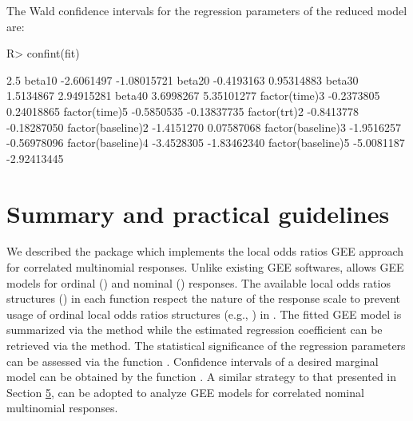 \documentclass[
]{jss}
\begin{document}
The Wald confidence intervals for the regression parameters of the
reduced model are:

\begin{CodeChunk}

\begin{CodeInput}
R> confint(fit)
\end{CodeInput}

\begin{CodeOutput}
                       2.5 %
beta10            -2.6061497 -1.08015721
beta20            -0.4193163  0.95314883
beta30             1.5134867  2.94915281
beta40             3.6998267  5.35101277
factor(time)3     -0.2373805  0.24018865
factor(time)5     -0.5850535 -0.13837735
factor(trt)2      -0.8413778 -0.18287050
factor(baseline)2 -1.4151270  0.07587068
factor(baseline)3 -1.9516257 -0.56978096
factor(baseline)4 -3.4528305 -1.83462340
factor(baseline)5 -5.0081187 -2.92413445
\end{CodeOutput}
\end{CodeChunk}

\hypertarget{Summary}{%
\section{Summary and practical guidelines}\label{Summary}}

We described the  package  which implements the
local odds ratios GEE approach \citep{Touloumis2012} for correlated
multinomial responses. Unlike existing GEE softwares, 
allows GEE models for ordinal () and nominal
() responses. The available local odds ratios structures
() in each function respect the nature of the response
scale to prevent usage of ordinal local odds ratios structures (e.g.,
) in . The fitted GEE model is
summarized via the  method while the estimated regression
coefficient can be retrieved via the  method. The statistical
significance of the regression parameters can be assessed via the
function . Confidence intervals of a desired marginal model
can be obtained by the function . A similar strategy to
that presented in Section \protect\hyperlink{Example}{5}, can be adopted
to analyze GEE models for correlated nominal multinomial responses.
\end{document}
